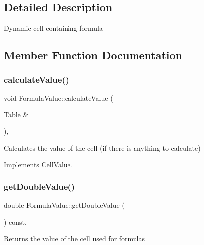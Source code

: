 \subsection{Detailed Description}
Dynamic cell containing formula 

\subsection{Member Function Documentation}
\mbox{\label{classFormulaValue_a8b8462588f3d533f6a5a39adee4f3eba}} 
\subsubsection{\texorpdfstring{calculate\+Value()}{calculateValue()}}
{\footnotesize\ttfamily void Formula\+Value\+::calculate\+Value (\begin{DoxyParamCaption}\item[{\hyperlink{classTable}{Table} \&}]{ }\end{DoxyParamCaption})\hspace{0.3cm}{\ttfamily [override]}, {\ttfamily [virtual]}}

Calculates the value of the cell (if there is anything to calculate) 

Implements \hyperlink{classCellValue_ab644256decf3608ed50e389ead6cf611}{Cell\+Value}.

\mbox{\label{classFormulaValue_a164f0c3e517db2fb4423e27e54ca4a60}} 
\subsubsection{\texorpdfstring{get\+Double\+Value()}{getDoubleValue()}}
{\footnotesize\ttfamily double Formula\+Value\+::get\+Double\+Value (\begin{DoxyParamCaption}{ }\end{DoxyParamCaption}) const\hspace{0.3cm}{\ttfamily [override]}, {\ttfamily [virtual]}}

Returns the value of the cell used for formulas

